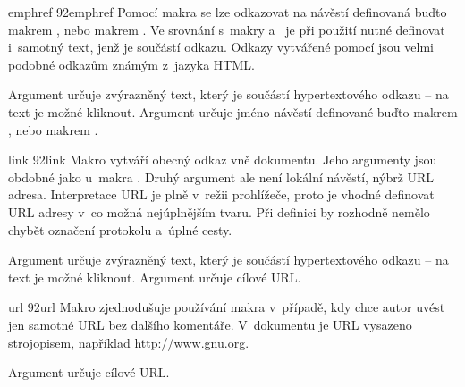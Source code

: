 \documentclass[12pt]{article}
\begin{document}
\medskip
\begin{makro}{emphref}
  {\char92emphref}
  Pomocí makra  se lze odkazovat na návěstí definovaná buďto
  makrem , nebo makrem . Ve srovnání 
  s~makry  a~ je při použití 
  nutné definovat i~samotný text, jenž je součástí odkazu. Odkazy vytvářené
  pomocí  jsou velmi podobné odkazům známým z~jazyka HTML.

  \smallskip
  Argument  určuje zvýrazněný text, který je součástí hypertextového
  odkazu -- na text je možné kliknout. Argument  určuje jméno
  návěstí definované buďto makrem ,
  nebo makrem .

  \begin{example}
  \end{example}
\end{makro}

\medskip
\begin{makro}{link}
  {\char92link}
  Makro  vytváří obecný odkaz vně dokumentu. Jeho argumenty jsou
  obdobné jako u~makra . Druhý argument ale není lokální návěstí,
  nýbrž URL adresa. Interpretace URL je plně v~režii prohlížeče, 
  proto je vhodné definovat URL adresy v~co možná nejúplnějším tvaru. 
  Při definici by rozhodně nemělo chybět označení protokolu a~úplné cesty. 

  \smallskip
  Argument  určuje zvýrazněný text, který je součástí hypertextového
  odkazu -- na text je možné kliknout. Argument  určuje cílové URL.

  \begin{example}
  \end{example}
\end{makro}

\medskip
\begin{makro}{url}
  {\char92url}
  Makro  zjednodušuje používání makra  v~případě, kdy chce
  autor uvést jen samotné URL bez dalšího komentáře. V~dokumentu je URL
  vysazeno strojopisem, například \url{http://www.gnu.org}.

  \smallskip
  Argument  určuje cílové URL.

  \begin{example}
  \end{example}
\end{makro}
\end{document}
